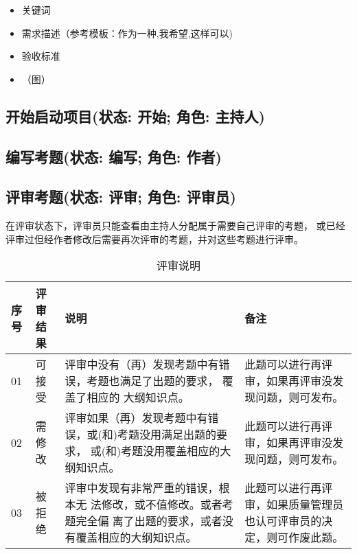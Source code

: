 \documentclass[hyperref, a4paper]{ctexart}
\providecommand{\tightlist}{%
  \setlength{\itemsep}{0pt}\setlength{\parskip}{0pt}}
\begin{document}
\begin{itemize}
\tightlist
\item
  关键词
\item
  需求描述（参考模板：作为一种,我希望,这样可以)
\item
  验收标准
\item
  （图）
\end{itemize}

\hypertarget{ux5f00ux59cbux542fux52a8ux9879ux76eeux72b6ux6001-ux5f00ux59cb-ux89d2ux8272-ux4e3bux6301ux4eba}{%
\subsection{开始启动项目(状态: 开始; 角色:
主持人)}\label{ux5f00ux59cbux542fux52a8ux9879ux76eeux72b6ux6001-ux5f00ux59cb-ux89d2ux8272-ux4e3bux6301ux4eba}}

\hypertarget{ux7f16ux5199ux8003ux9898ux72b6ux6001-ux7f16ux5199-ux89d2ux8272-ux4f5cux8005}{%
\subsection{编写考题(状态: 编写; 角色:
作者)}\label{ux7f16ux5199ux8003ux9898ux72b6ux6001-ux7f16ux5199-ux89d2ux8272-ux4f5cux8005}}

\hypertarget{ux8bc4ux5ba1ux8003ux9898ux72b6ux6001-ux8bc4ux5ba1-ux89d2ux8272-ux8bc4ux5ba1ux5458}{%
\subsection{评审考题(状态: 评审; 角色:
评审员)}\label{ux8bc4ux5ba1ux8003ux9898ux72b6ux6001-ux8bc4ux5ba1-ux89d2ux8272-ux8bc4ux5ba1ux5458}}

在评审状态下，评审员只能查看由主持人分配属于需要自己评审的考题，
或已经评审过但经作者修改后需要再次评审的考题，并对这些考题进行评审。

\begin{table}[!htbp]
  \caption{评审说明}
  \label{Tab:bookRWCal}
  \centering
  \begin{tabular}{|l|p{1.5cm}|p{5.3cm}|p{3.3cm}|}
  \hline
  \textbf{序号} &\textbf{评审结果} &\textbf{说明}&\textbf{备注}\\
  \hline
  01 & 可接受  & 评审中没有（再）发现考题中有错误，考题也满足了出题的要求，
  覆盖了相应的 大纲知识点。& 此题可以进行再评审，如果再评审没发现问题，则可发布。\\
  \hline
  02 & 需修改  & 评审如果（再）发现考题中有错误，或(和)考题没用满足出题的要求，
  或(和)考题没用覆盖相应的大纲知识点。& 此题可以进行再评审，如果再评审没发现问题，则可发布。\\
  \hline
  03  & 被拒绝 & 评审中发现有非常严重的错误，根本无 法修改，或不值修改。或者考题完全偏
  离了出题的要求，或者没有覆盖相应的大纲知识点。& 此题可以进行再评审，如果质量管理员也认可评审员的决定，则可作废此题。\\
  \hline
  \end{tabular}
\end{table}
\end{document}
